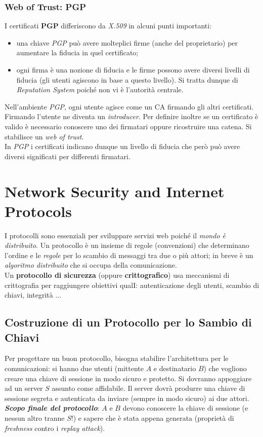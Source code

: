 \documentclass[11pt, a4paper, twoside, italian]{report}
\theoremstyle{plain}
\begin{document}
\subsection*{Web of Trust: PGP}
I certificati \textbf{PGP} differiscono da \textit{X.509} in alcuni punti importanti:
\begin{itemize}
	\item una chiave \textit{PGP} può avere molteplici firme (anche del proprietario) per aumentare la fiducia in quel certificato;
	\item ogni firma è una nozione di fiducia e le firme possono avere diversi livelli di fiducia (gli utenti agiscono in base a questo livello). Si tratta dunque di \textit{Reputation System} poiché non vi è l'autorità centrale.
\end{itemize}
\noindent
Nell'ambiente \textit{PGP}, ogni utente agisce come un CA firmando gli altri certificati. Firmando l'utente ne diventa un \textit{introducer}. Per definire inoltre se un certificato è valido è necessario conoscere uno dei firmatari oppure ricostruire una catena. Si stabilisce un \textit{web of trust}.\\
In \textit{PGP} i certificati indicano dunque un livello di fiducia che però può avere diversi significati per differenti firmatari.



\chapter*{Network Security and Internet Protocols}
I protocolli sono essenziali per sviluppare servizi web poiché il \textit{mondo è distribuito}.
Un protocollo è un insieme di regole (convenzioni) che determinano l'ordine e le \textit{regole} per lo scambio di messaggi tra due o più attori; in breve è un \textit{algoritmo distribuito} che si occupa della comunicazione.\\
Un \textbf{protocollo di sicurezza} (oppure \textbf{crittografico}) usa meccanismi di crittografia per raggiungere obiettivi qualI: autenticazione degli utenti, scambio di chiavi, integrità $\dots$

\section*{Costruzione di un Protocollo per lo Sambio di Chiavi}
Per progettare un buon protocollo, bisogna stabilire l'architettura per le comunicazioni: si hanno due utenti (mittente $A$ e destinatario $B$) che vogliono creare una chiave di sessione in modo sicuro e protetto. Si dovranno appoggiare ad un server $S$ assunto come affidabile. Il server dovrà produrre una chiave di sessione segreta e autenticata da inviare (sempre in modo sicuro) ai due attori.\\
\textit{\textbf{Scopo finale del protocollo}}: $A$ e $B$ devono conoscere la chiave di sessione (e nessun altro tranne $S$!) e sapere che è stata appena generata (proprietà di \textit{freshness} contro i \textit{replay attack}).
\end{document}
